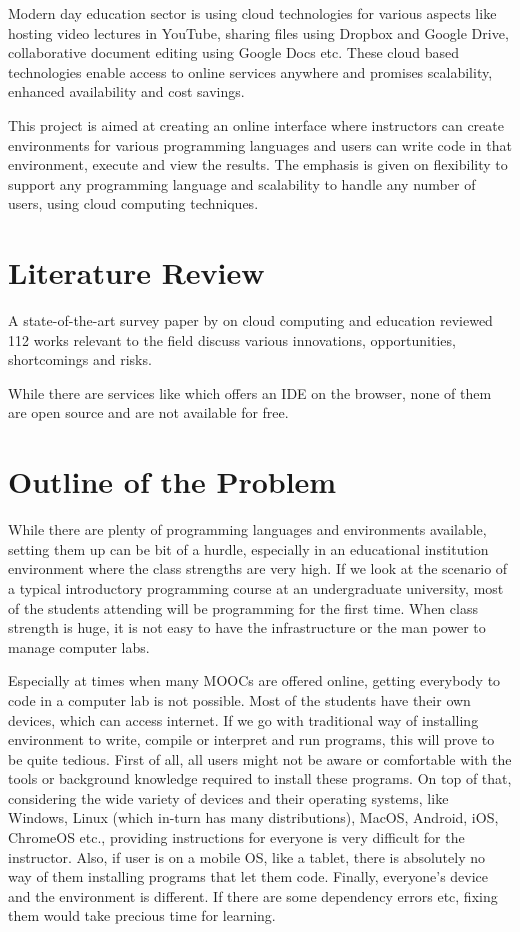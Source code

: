 \documentclass[DD]{iitmdiss}
\begin{document}
Modern day education sector is using cloud technologies for various aspects like hosting video lectures in YouTube, sharing files using Dropbox and Google Drive, collaborative document editing using Google Docs etc. These cloud based technologies enable access to online services anywhere and promises scalability, enhanced availability and cost savings.

This project is aimed at creating an online interface where instructors can create environments for various programming languages and users can write code in that environment, execute and view the results. The emphasis is given on flexibility to support any programming language and scalability to handle any number of users, using cloud computing techniques.
\section{Literature Review}
A state-of-the-art survey paper by \cite{gonzalez-martinez_cloud_2015} on cloud computing and education reviewed 112 works relevant to the field discuss various innovations, opportunities, shortcomings and risks.

While there are services like \cite{codeanywhere} which offers an IDE on the browser, none of them are open source and are not available for free.

\section{Outline of the Problem}

While there are plenty of programming languages and environments available, setting them up can be bit of a hurdle, especially in an educational institution environment where the class strengths are very high. If we look at the scenario of a typical introductory programming course at an undergraduate university, most of the students attending will be programming for the first time. When class strength is huge, it is not easy to have the infrastructure or the man power to manage computer labs. 

Especially at times when many MOOCs are offered online, getting everybody to code in a computer lab is not possible. Most of the students have their own devices, which can access internet. If we go with traditional way of installing environment to write, compile or interpret and run programs, this will prove to be quite tedious. First of all, all users might not be aware or comfortable with the tools or background knowledge required to install these programs. On top of that, considering the wide variety of devices and their operating systems, like Windows, Linux (which in-turn has many distributions), MacOS, Android, iOS, ChromeOS etc., providing instructions for everyone is very difficult for the instructor. Also, if user is on a mobile OS, like a tablet, there is absolutely no way of them installing programs that let them code. Finally, everyone's device and the environment is different. If there are some dependency errors etc, fixing them would take precious time for learning.
\end{document}
